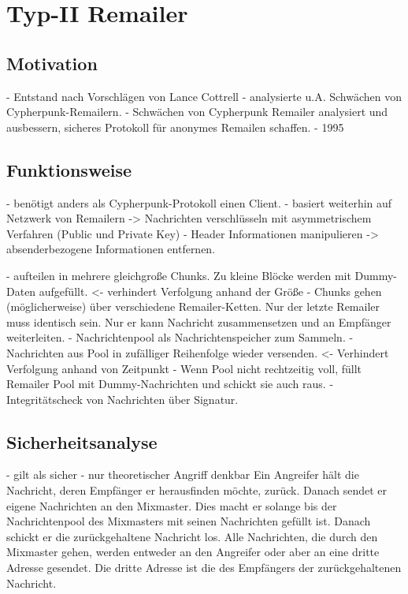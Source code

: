 \chapter{Typ-II Remailer}
\section{Motivation}
- Entstand nach Vorschlägen von Lance Cottrell - analysierte u.A. Schwächen von Cypherpunk-Remailern.
- Schwächen von Cypherpunk Remailer analysiert und ausbessern, sicheres Protokoll für anonymes Remailen schaffen.
- 1995

\section{Funktionsweise}
- benötigt anders als Cypherpunk-Protokoll einen Client.
- basiert weiterhin auf Netzwerk von Remailern -> Nachrichten verschlüsseln mit asymmetrischem Verfahren (Public und Private Key)
- Header Informationen manipulieren -> absenderbezogene Informationen entfernen.

- aufteilen in mehrere gleichgroße Chunks. Zu kleine Blöcke werden mit Dummy-Daten aufgefüllt. <- verhindert Verfolgung anhand der Größe
- Chunks gehen (möglicherweise) über verschiedene Remailer-Ketten. Nur der letzte Remailer muss identisch sein. Nur er kann Nachricht zusammensetzen und an Empfänger weiterleiten.
- Nachrichtenpool als Nachrichtenspeicher zum Sammeln.
- Nachrichten aus Pool in zufälliger Reihenfolge wieder versenden. <- Verhindert Verfolgung anhand von Zeitpunkt
- Wenn Pool nicht rechtzeitig voll, füllt Remailer Pool mit Dummy-Nachrichten und schickt sie auch raus.
- Integritätscheck von Nachrichten über Signatur.

\section{Sicherheitsanalyse}
- gilt als sicher
- nur theoretischer Angriff denkbar
Ein Angreifer hält die Nachricht, deren Empfänger er herausfinden möchte, zurück. Danach sendet er eigene Nachrichten an den Mixmaster. Dies macht er solange bis der Nachrichtenpool des Mixmasters mit seinen Nachrichten gefüllt ist. Danach schickt er die zurückgehaltene Nachricht los. Alle Nachrichten, die durch den Mixmaster gehen, werden entweder an den Angreifer oder aber an eine dritte Adresse gesendet. Die dritte Adresse ist die des Empfängers der zurückgehaltenen Nachricht.
